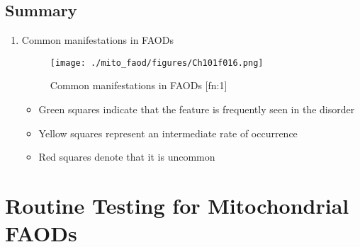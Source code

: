 \documentclass{scrartcl}
\begin{document}
\subsection{Summary}
\label{sec:org08b9757}
\begin{enumerate}
\item Common manifestations in FAODs
\label{sec:org61a8408}
\begin{figure}[htbp]
\centering
\texttt{[image: ./mito\_faod/figures/Ch101f016.png]}
\caption{\label{fig:orga79e3d2}
Common manifestations in FAODs [fn:1]}
\end{figure}

\begin{itemize}
\item Green squares indicate that the feature is frequently seen in the disorder
\item Yellow squares represent an intermediate rate of occurrence
\item Red squares denote that it is uncommon
\end{itemize}
\end{enumerate}

\section{Routine Testing for Mitochondrial FAODs}
\label{sec:org587e78e}
\end{document}
